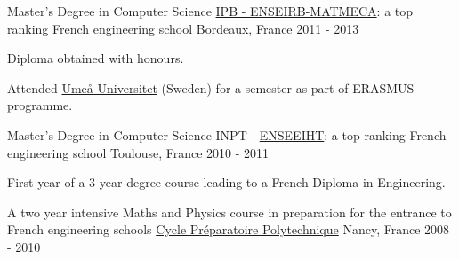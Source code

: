 
	\begin{cventries}
	
		\cventry
			{Master's Degree in Computer Science}
			{\href{https://enseirb-matmeca.bordeaux-inp.fr/fr}{IPB - ENSEIRB-MATMECA}: a top ranking French engineering school}
			{Bordeaux, France}
			{2011 - 2013}
			{	
				\begin{cvitems}
					\item Diploma obtained with honours.
					\item Attended \href{http://www.umu.se}{Ume\aa{} Universitet} (Sweden) for a semester as part of ERASMUS programme.
				\end{cvitems}
			}
		
		
		\cventry
			{Master's Degree in Computer Science}
			{INPT - \href{http://www.enseeiht.fr}{ENSEEIHT}: a top ranking French engineering school}
			{Toulouse, France}
			{2010 - 2011}
			{
				\begin{cvitems}
					\item First year of a 3-year degree course leading to a French Diploma in Engineering.
				\end{cvitems}
			}
		
		\cventry
			{A two year intensive Maths and Physics course in preparation for the entrance to French engineering schools}
			{\href{http://www.la-prepa-des-inp.fr}{Cycle Préparatoire Polytechnique}}
			{Nancy, France}
			{2008 - 2010}
			{}
		
		
	
	\end{cventries}
